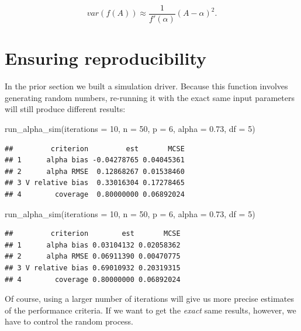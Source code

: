 \documentclass[
]{book}
\newenvironment{Shaded}{\begin{snugshade}}{\end{snugshade}}
\newcommand{\AttributeTok}[1]{\textcolor[rgb]{0.77,0.63,0.00}{#1}}
\newcommand{\DecValTok}[1]{\textcolor[rgb]{0.00,0.00,0.81}{#1}}
\newcommand{\FloatTok}[1]{\textcolor[rgb]{0.00,0.00,0.81}{#1}}
\newcommand{\FunctionTok}[1]{\textcolor[rgb]{0.00,0.00,0.00}{#1}}
\newcommand{\NormalTok}[1]{#1}
\begin{document}
\[ var( f(A) ) \approx \frac{1}{f'(\alpha)} (A - \alpha)^2 . \]

\hypertarget{sec_reproducability}{%
\chapter{Ensuring reproducibility}\label{sec_reproducability}}

In the prior section we built a simulation driver.
Because this function involves generating random numbers, re-running it with the exact same input parameters will still produce different results:

\begin{Shaded}
\begin{Highlighting}[]
\FunctionTok{run\_alpha\_sim}\NormalTok{(}\AttributeTok{iterations =} \DecValTok{10}\NormalTok{, }\AttributeTok{n =} \DecValTok{50}\NormalTok{, }\AttributeTok{p =} \DecValTok{6}\NormalTok{, }\AttributeTok{alpha =} \FloatTok{0.73}\NormalTok{, }\AttributeTok{df =} \DecValTok{5}\NormalTok{)}
\end{Highlighting}
\end{Shaded}

\begin{verbatim}
##         criterion         est       MCSE
## 1      alpha bias -0.04278765 0.04045361
## 2      alpha RMSE  0.12868267 0.01538460
## 3 V relative bias  0.33016304 0.17278465
## 4        coverage  0.80000000 0.06892024
\end{verbatim}

\begin{Shaded}
\begin{Highlighting}[]
\FunctionTok{run\_alpha\_sim}\NormalTok{(}\AttributeTok{iterations =} \DecValTok{10}\NormalTok{, }\AttributeTok{n =} \DecValTok{50}\NormalTok{, }\AttributeTok{p =} \DecValTok{6}\NormalTok{, }\AttributeTok{alpha =} \FloatTok{0.73}\NormalTok{, }\AttributeTok{df =} \DecValTok{5}\NormalTok{)}
\end{Highlighting}
\end{Shaded}

\begin{verbatim}
##         criterion        est       MCSE
## 1      alpha bias 0.03104132 0.02058362
## 2      alpha RMSE 0.06911390 0.00470775
## 3 V relative bias 0.69010932 0.20319315
## 4        coverage 0.80000000 0.06892024
\end{verbatim}

Of course, using a larger number of iterations will give us more precise estimates of the performance criteria. If we want to get the \emph{exact} same results, however, we have to control the random process.
\end{document}
